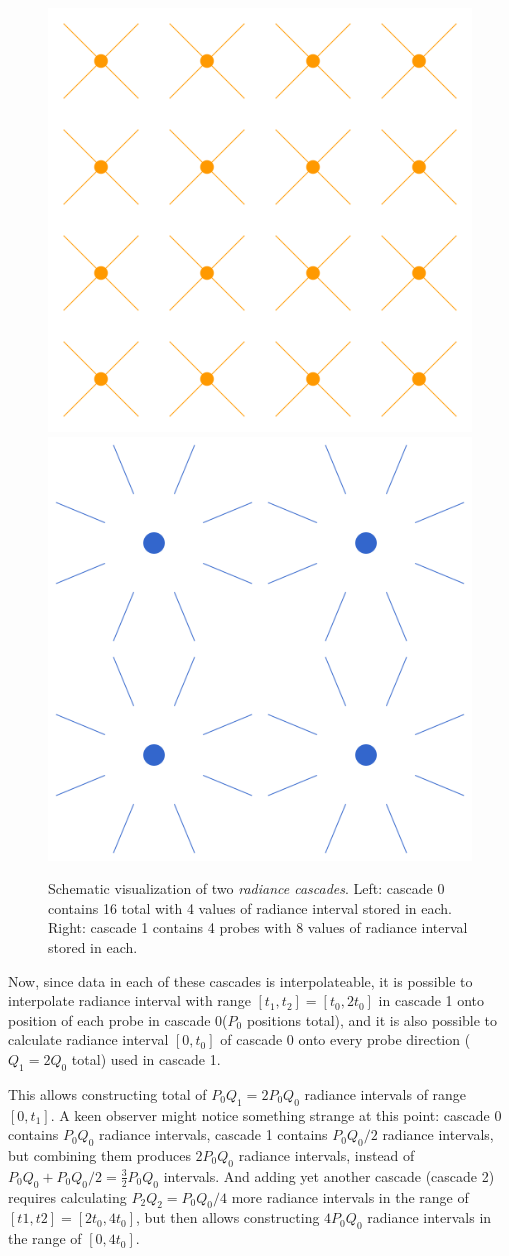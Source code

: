 \documentclass{jcgt}
\begin{document}
\begin{figure}[htb]
  \centering
  \includegraphics[width=0.49\columnwidth]{images/cascade 0.png}
  \includegraphics[width=0.49\columnwidth]{images/cascade 1.png}
  \caption{\label{fig:cascades}
     Schematic visualization of two \emph{radiance cascades}. Left: cascade 0 contains 16 total with 4 values of radiance interval stored in each. Right: cascade 1 contains 4 probes with 8 values of radiance interval stored in each.}
\end{figure}


Now, since data in each of these cascades is interpolateable, it is possible to interpolate radiance interval with range $[t_1, t_2]=[t_0,2t_0]$ in cascade 1 onto position of each probe in cascade 0($P_0$ positions total), and
it is also possible to calculate radiance interval $[0,t_0]$ of cascade 0 onto every probe direction ($Q_1=2Q_0$ total) used in cascade 1.



This allows constructing total of $P_0Q_1=2P_0Q_0$ radiance intervals of range $[0,t_1]$. A keen observer might notice something strange at this point: cascade 0 contains $P_0Q_0$ radiance intervals,
cascade 1 contains $P_0Q_0/2$ radiance intervals, but combining them produces $2P_0Q_0$ radiance intervals, instead of $P_0Q_0+P_0Q_0/2=\frac{3}{2}P_0Q_0$ intervals. And adding yet another cascade (cascade 2) requires calculating
$P_2Q_2=P_0Q_0/4$ more radiance intervals in the range of $[t1,t2]=[2t_0,4t_0]$, but then allows constructing $4P_0Q_0$ radiance intervals in the range of $[0,4t_0]$.
\end{document}
